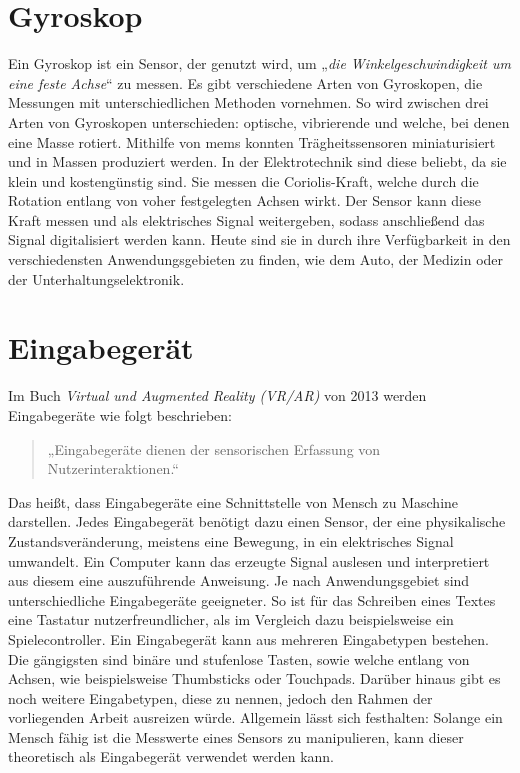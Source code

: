 \section{Gyroskop}
Ein Gyroskop ist ein Sensor, der genutzt wird, um „\textit{die Winkelgeschwindigkeit um eine feste Achse}“ zu messen\cite{armeniseAdvancesGyroscopeTechnologies2010}.
Es gibt verschiedene Arten von Gyroskopen, die Messungen mit unterschiedlichen Methoden vornehmen.
So wird zwischen drei Arten von Gyroskopen unterschieden: optische, vibrierende und welche, bei denen eine Masse rotiert.
Mithilfe von \ac{mems} konnten Trägheitssensoren miniaturisiert und in Massen produziert werden.
In der Elektrotechnik sind diese beliebt, da sie klein und kostengünstig sind\cite{maenakaMEMSInertialSensors2008}.
Sie messen die Coriolis-Kraft, welche durch die Rotation entlang von voher festgelegten Achsen wirkt.
Der Sensor kann diese Kraft messen und als elektrisches Signal weitergeben, sodass anschließend das Signal digitalisiert werden kann\cite{utmelMPU6050ModuleDatasheet}.
Heute sind sie in durch ihre Verfügbarkeit in den verschiedensten Anwendungsgebieten zu finden, wie dem Auto, der Medizin oder der Unterhaltungselektronik\cite{armeniseAdvancesGyroscopeTechnologies2010}.

\section{Eingabegerät}
Im Buch \textit{Virtual und Augmented Reality (VR/AR)} von 2013 werden Eingabegeräte wie folgt beschrieben:

\begin{quote}
    „Eingabegeräte dienen der sensorischen Erfassung von Nutzerinteraktionen.“\cite{doernerVirtualUndAugmented2013}
\end{quote}

Das heißt, dass Eingabegeräte eine Schnittstelle von Mensch zu Maschine darstellen.
Jedes Eingabegerät benötigt dazu einen Sensor, der eine physikalische Zustandsveränderung, meistens eine Bewegung, in ein elektrisches Signal umwandelt.
Ein Computer kann das erzeugte Signal auslesen und interpretiert aus diesem eine auszuführende Anweisung.
Je nach Anwendungsgebiet sind unterschiedliche Eingabegeräte geeigneter.
So ist für das Schreiben eines Textes eine Tastatur nutzerfreundlicher, als im Vergleich dazu beispielsweise ein Spielecontroller.
Ein Eingabegerät kann aus mehreren Eingabetypen bestehen.
Die gängigsten sind binäre und stufenlose Tasten, sowie welche entlang von Achsen, wie beispielsweise Thumbsticks oder Touchpads.
Darüber hinaus gibt es noch weitere Eingabetypen, diese zu nennen, jedoch den Rahmen der vorliegenden Arbeit ausreizen würde.
Allgemein lässt sich festhalten:
Solange ein Mensch fähig ist die Messwerte eines Sensors zu manipulieren, kann dieser theoretisch als Eingabegerät verwendet werden kann.